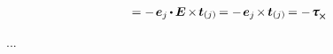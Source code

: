 \begin{otherlanguage}{russian}
\begin{multline*}
= - \hspace{.25ex} \bm{e}_{j} \hspace{-0.15ex} \dotp \hspace{-0.1ex} \UnitDyad \hspace{-0.2ex} \times \hspace{-0.25ex} \tractionvector{j}
= - \hspace{.25ex} \bm{e}_{j} \hspace{-0.25ex} \times \hspace{-0.2ex} \tractionvector{j}
= - \hspace{.2ex} \cauchystress_{\hspace{-0.1ex}\Xcompanion}
\end{multline*}

...

\end{otherlanguage}



